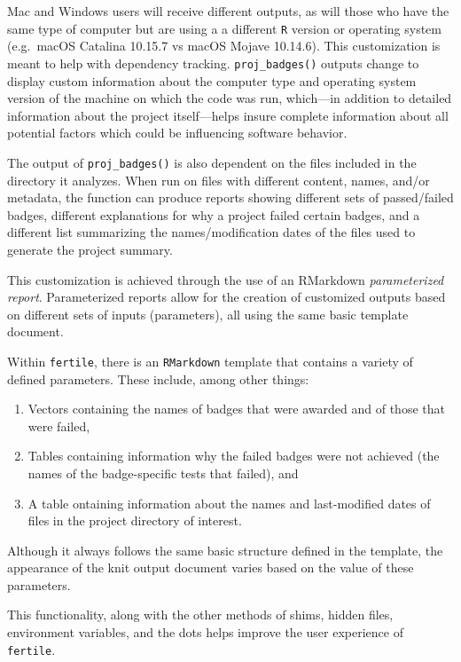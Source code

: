 \documentclass[12pt,twoside]{reedthesis}
\providecommand{\tightlist}{%
  \setlength{\itemsep}{0pt}\setlength{\parskip}{0pt}}
\begin{document}
Mac and Windows users will receive different outputs, as will those who have the same type of computer but are using a a different \texttt{R} version or operating system (e.g.~macOS Catalina 10.15.7 vs macOS Mojave 10.14.6). This customization is meant to help with dependency tracking. \texttt{proj\_badges()} outputs change to display custom information about the computer type and operating system version of the machine on which the code was run, which---in addition to detailed information about the project itself---helps insure complete information about all potential factors which could be influencing software behavior.

The output of \texttt{proj\_badges()} is also dependent on the files included in the directory it analyzes. When run on files with different content, names, and/or metadata, the function can produce reports showing different sets of passed/failed badges, different explanations for why a project failed certain badges, and a different list summarizing the names/modification dates of the files used to generate the project summary.

This customization is achieved through the use of an RMarkdown \emph{parameterized report}. Parameterized reports allow for the creation of customized outputs based on different sets of inputs (parameters), all using the same basic template document.

Within \texttt{fertile}, there is an \texttt{RMarkdown} template that contains a variety of defined parameters. These include, among other things:
\begin{enumerate}
\def\labelenumi{\arabic{enumi}.}
\tightlist
\item
  Vectors containing the names of badges that were awarded and of those that were failed,
\item
  Tables containing information why the failed badges were not achieved (the names of the badge-specific tests that failed), and
\item
  A table ontaining information about the names and last-modified dates of files in the project directory of interest.
\end{enumerate}
Although it always follows the same basic structure defined in the template, the appearance of the knit output document varies based on the value of these parameters.

This functionality, along with the other methods of shims, hidden files, environment variables, and the dots helps improve the user experience of \texttt{fertile}.
\end{document}
